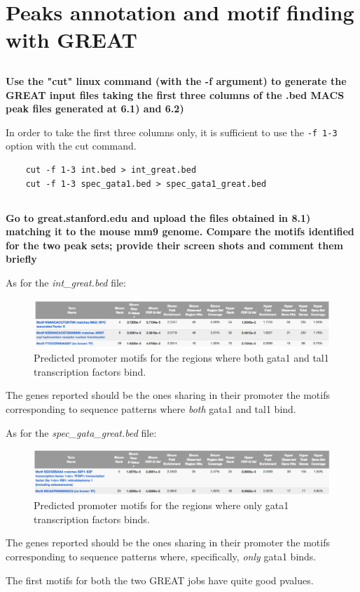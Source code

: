 \documentclass[12pt, a4paper]{article}
\begin{document}
	
	\section{Peaks annotation and motif finding with GREAT}
	
	\subsection{}
	\textbf{Use the "cut" linux command (with the -f argument) to generate the GREAT input files taking the first three columns of the .bed MACS peak files generated at 6.1) and 6.2)}
	
	In order to take the first three columns only, it is sufficient to use the \verb|-f 1-3| option with the cut command.
	
	\begin{verbatim}
	cut -f 1-3 int.bed > int_great.bed
	cut -f 1-3 spec_gata1.bed > spec_gata1_great.bed
	\end{verbatim}
	
	\subsection{}
	\textbf{Go to great.stanford.edu and upload the files obtained in 8.1) matching it to the mouse mm9 genome. Compare the motifs identified for the two peak sets; provide their screen shots and comment them briefly}
	
	As for the \textit{int\_great.bed} file:
	
	\begin{figure}[h]
		\centering
		\includegraphics[width = .99\textwidth]{int_great}
		\caption{Predicted promoter motifs for the regions where both gata1 and tal1 transcription factors bind.}
		\label{fig:int_great}
	\end{figure}
	
	The genes reported should be the ones sharing in their promoter the motifs corresponding to sequence patterns where \textit{both} gata1 and tal1 bind.
	
	As for the \textit{spec\_gata\_great.bed} file:
	
	\begin{figure}[h]
		\centering
		\includegraphics[width = .99\textwidth]{spec_gata_great}
		\caption{Predicted promoter motifs for the regions where only gata1 transcription factors binds.}
		\label{fig:spec_gata_great}
	\end{figure}
	
	The genes reported should be the ones sharing in their promoter the motifs corresponding to sequence patterns where, specifically, \textit{only} gata1 binds.
	
	The first motifs for both the two GREAT jobs have quite good pvalues.
	
\end{document}
